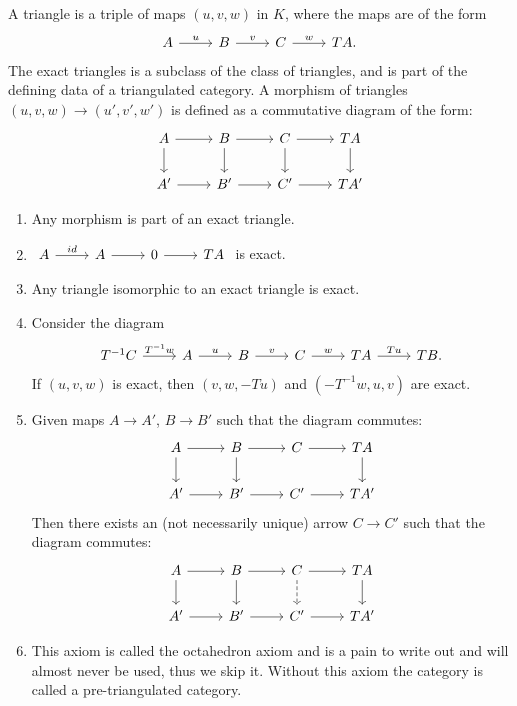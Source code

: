 \documentclass[a4paper, UKenglish]{report}
\begin{document}
A triangle is a triple of maps $(u, v, w)$ in $K$, where the maps are of the form 
\[
    \begin{tikzcd} 
        A \arrow[r, "u"] & B \arrow[r, "v"] & C \arrow[r, "w"] & TA. 
    \end{tikzcd}
\]
The exact triangles is a subclass of the class of triangles, and is part of the defining data of a triangulated category.
A morphism of triangles $(u, v, w) \to (u', v', w')$ is defined as a commutative diagram of the form:
\[
    \begin{tikzcd}
        A \ar{d} \ar{r} & B \ar{d} \ar{r} & C \ar{d} \ar{r} & \ar{d} TA \\
        A' \ar{r} & B' \ar{r} & C' \ar{r} & TA' 
    \end{tikzcd} 
\]
\begin{enumerate}
    \item Any morphism is part of an exact triangle.
    
    \item $\begin{tikzcd} A \arrow[r, "id"] & A \arrow[r] & 0 \arrow[r] & TA \end{tikzcd}$ is exact.
    
    \item Any triangle isomorphic to an exact triangle is exact.

    \item Consider the diagram 
    \[
        \begin{tikzcd}
            T^{-1}C \arrow[r, "T^{-1}w"] & A \arrow[r, "u"] & B \arrow[r, "v"] & C \arrow[r, "w"] & TA \arrow[r, "Tu"] & TB.
        \end{tikzcd}
    \] 
    If $(u,v,w)$ is exact, then $(v,w,-Tu)$ and $(-T^{-1}w,u,v)$ are exact.

    \item  Given maps $A \to A'$, $B \to B'$ such that the diagram commutes:
    \[
        \begin{tikzcd}
            A \ar{d} \ar{r} & B \ar{d} \ar{r} & C  \ar{r} & \ar{d} TA \\
            A' \ar{r} & B' \ar{r} & C' \ar{r} & TA' 
        \end{tikzcd}
    \]
    Then there exists an (not necessarily unique) arrow $C \to C'$ such that the diagram commutes:
    \[
        \begin{tikzcd}
            A \ar{d} \ar{r} & B \ar{d} \ar{r} & C \arrow[dashed]{d} \ar{r} & \ar{d} TA \\
            A' \ar{r} & B' \ar{r} & C' \ar{r} & TA' 
        \end{tikzcd} 
    \]

    \item This axiom is called the octahedron axiom and is a pain to write out and will almost never be used, thus we skip it. Without this axiom the category is called a pre-triangulated category.
\end{enumerate}
\end{document}
